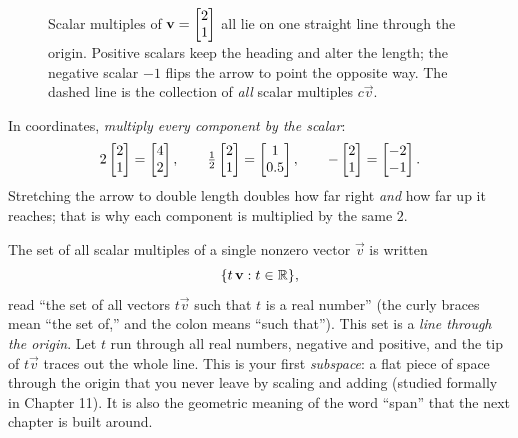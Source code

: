 \begin{figure}[H]
\centering
{}
\caption{Scalar multiples of $\mathbf{v}=\begin{bmatrix}2\\1\end{bmatrix}$ all lie on one straight line through the
origin. Positive scalars keep the heading and alter the length; the negative scalar
$-1$ flips the arrow to point the opposite way. The dashed line is the collection of \emph{all}
scalar multiples $c\vec{v}$.}
\label{ch02:fig-scale}
\end{figure}

In coordinates, \emph{multiply every component by the scalar}:
\[
  2\begin{bmatrix}2\\1\end{bmatrix}=\begin{bmatrix}4\\2\end{bmatrix},\qquad
  \tfrac12\begin{bmatrix}2\\1\end{bmatrix}=\begin{bmatrix}1\\0.5\end{bmatrix},\qquad
  -\begin{bmatrix}2\\1\end{bmatrix}=\begin{bmatrix}-2\\-1\end{bmatrix}.
\]
Stretching the arrow to double length doubles how far right \emph{and} how far up it
reaches; that is why each component is multiplied by the same $2$.

\begin{focusbox}
The set of all scalar multiples of a single nonzero vector $\vec{v}$ is written
\[
  \{t\,\mathbf{v} : t \in \mathbb{R}\},
\]
read ``the set of all vectors $t\vec{v}$ such that $t$ is a real number'' (the curly
braces mean ``the set of,'' and the colon means ``such that''). This set is a
\emph{line through the origin}. Let $t$ run through all real numbers, negative and
positive, and the tip of $t\vec{v}$ traces out the whole line. This is your first
\emph{subspace}: a flat piece of space through the origin that you never leave by
scaling and adding (studied formally in Chapter 11). It is also the geometric meaning
of the word ``span'' that the next chapter is built around.
\end{focusbox}


